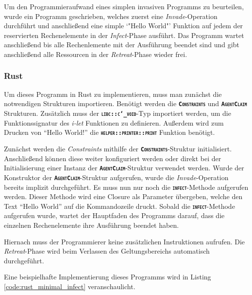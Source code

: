 Um den Programmieraufwand eines simplen invasiven Programms zu beurteilen, wurde ein Programm geschrieben, 
welches zuerst eine \textit{Invade}-Operation durchführt und anschließend eine simple `"Hello World"'
Funktion auf jedem der reservierten Rechenelemente in der \textit{Infect}-Phase ausführt.
Das Programm wartet anschließend bis alle Rechenlemente mit der Ausführung beendet sind und gibt anschließend
alle Ressourcen in der \textit{Retreat}-Phase wieder frei.

\subsubsection{Rust}

Um dieses Programm in Rust zu implementieren, muss man zunächst die notwendigen Strukturen importieren.
Benötigt werden die \texttt{\textsc{\textbf{Constraints}}} und \texttt{\textsc{\textbf{AgentClaim}}} Strukturen. 
Zusätzlich muss der \texttt{\textsc{\textbf{libc::c\char`_void}}}-Typ importiert werden,
um die Funktionssignatur des \textit{i-let} Funktionen zu definieren.
Außerdem wird zum Drucken von "`Hello World!"' die \texttt{\textsc{\textbf{helper::printer::print}}}
Funktion benötigt.

Zunächst werden die \textit{Constraints} mithilfe der \texttt{\textsc{\textbf{Constraints}}}-Struktur initialisiert.
Anschließend können diese weiter konfiguriert werden oder direkt bei der Initialisierung einer Instanz der
\texttt{\textsc{\textbf{AgentClaim}}}-Struktur verwendet werden. Wurde der Konstruktor
der \texttt{\textsc{\textbf{AgentClaim}}}-Struktur aufgerufen,
wurde die \textit{Invade}-Operation bereits implizit durchgeführt.
Es muss nun nur noch die \texttt{\textsc{\textbf{infect}}}-Methode aufgerufen werden.
Dieser Methode wird eine Closure als Parameter übergeben, welche den
Text "`Hello World"' auf die Kommandozeile druckt. Sobald die \texttt{\textsc{\textbf{infect}}}-Methode
aufgerufen wurde, wartet der Hauptfaden des Programms darauf,
dass die einzelnen Rechenelemente ihre Ausführung beendet haben.

Hiernach muss der Programmierer keine zusätzlichen Instruktionen aufrufen. Die \textit{Retreat}-Phase wird beim
Verlassen des Geltungsbereichs automatisch durchgeführt.

Eine beispielhafte Implementierung dieses Programms wird in Listing \ref{code:rust_minimal_infect} veranschaulicht.

